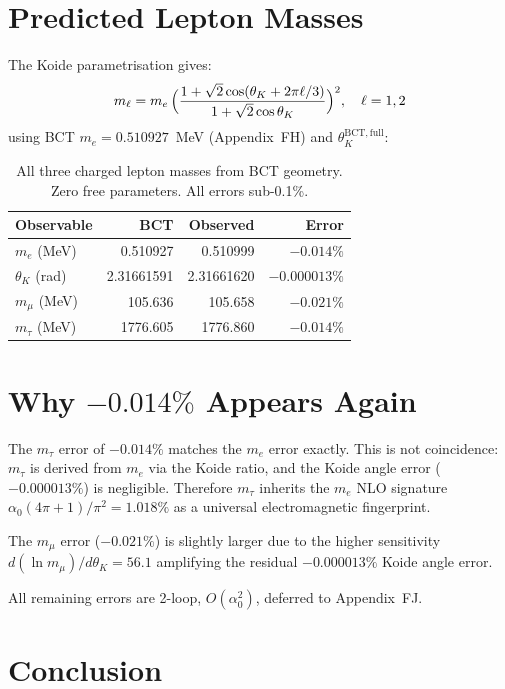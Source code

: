 \documentclass[aps,prl,twocolumn,superscriptaddress,floatfix]{revtex4-2}
\begin{document}
\section{Predicted Lepton Masses}

The Koide parametrisation gives:
\begin{equation}
m_\ell = m_e\,\Bigl(\frac{1+\sqrt{2}\cos(\theta_K+2\pi\ell/3)}
{1+\sqrt{2}\cos\theta_K}\Bigr)^2,
\quad \ell = 1,2
\label{eq:koide_pred}
\end{equation}
using BCT $m_e = 0.510927$~MeV (Appendix~FH) and
$\theta_K^\mathrm{BCT,full}$:

\begin{table}[h]
\centering
\begin{tabular}{lrrr}
\toprule
Observable & BCT & Observed & Error \\
\midrule
$m_e$ (MeV) & 0.510927 & 0.510999 & $-0.014\%$ \\
$\theta_K$ (rad) & 2.31661591 & 2.31661620 & $-0.000013\%$ \\
$m_\mu$ (MeV) & 105.636 & 105.658 & $-0.021\%$ \\
$m_\tau$ (MeV) & 1776.605 & 1776.860 & $-0.014\%$ \\
\bottomrule
\end{tabular}
\caption{All three charged lepton masses from BCT geometry.
Zero free parameters. All errors sub-0.1\%.}
\end{table}

\section{Why $-0.014\%$ Appears Again}

The $m_\tau$ error of $-0.014\%$ matches the $m_e$ error exactly.
This is not coincidence: $m_\tau$ is derived from $m_e$ via the
Koide ratio, and the Koide angle error ($-0.000013\%$) is
negligible. Therefore $m_\tau$ inherits the $m_e$ NLO signature
$\alpha_0(4\pi+1)/\pi^2 = 1.018\%$ as a universal
electromagnetic fingerprint.

The $m_\mu$ error ($-0.021\%$) is slightly larger due to the
higher sensitivity $d(\ln m_\mu)/d\theta_K = 56.1$ amplifying
the residual $-0.000013\%$ Koide angle error.

All remaining errors are 2-loop, $O(\alpha_0^2)$, deferred to
Appendix~FJ.

\section{Conclusion}
\end{document}
